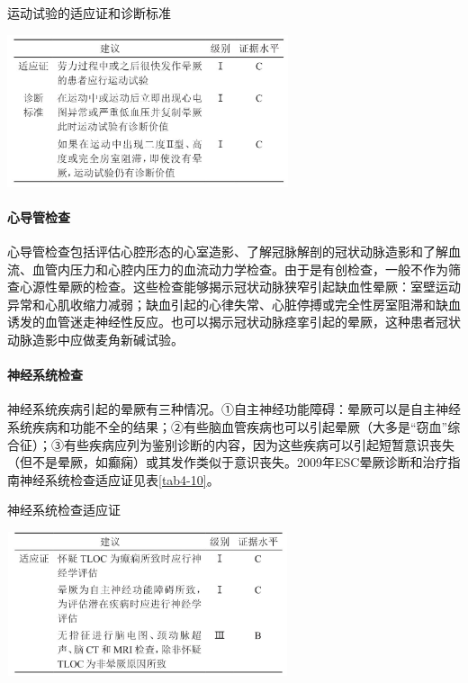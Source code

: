 \begin{table}[htbp]
\centering
\caption{运动试验的适应证和诊断标准}
\label{tab4-9}
\includegraphics[width=3.25in,height=1.76042in]{./images/Image00026.jpg}
\end{table}

\paragraph{心导管检查}

心导管检查包括评估心腔形态的心室造影、了解冠脉解剖的冠状动脉造影和了解血流、血管内压力和心腔内压力的血流动力学检查。由于是有创检查，一般不作为筛查心源性晕厥的检查。这些检查能够揭示冠状动脉狭窄引起缺血性晕厥：室壁运动异常和心肌收缩力减弱；缺血引起的心律失常、心脏停搏或完全性房室阻滞和缺血诱发的血管迷走神经性反应。也可以揭示冠状动脉痉挛引起的晕厥，这种患者冠状动脉造影中应做麦角新碱试验。

\paragraph{神经系统检查}

神经系统疾病引起的晕厥有三种情况。①自主神经功能障碍：晕厥可以是自主神经系统疾病和功能不全的结果；②有些脑血管疾病也可以引起晕厥（大多是“窃血”综合征）；③有些疾病应列为鉴别诊断的内容，因为这些疾病可以引起短暂意识丧失（但不是晕厥，如癫痫）或其发作类似于意识丧失。2009年ESC晕厥诊断和治疗指南神经系统检查适应证见表\ref{tab4-10}。

\begin{table}[htbp]
\centering
\caption{神经系统检查适应证}
\label{tab4-10}
\includegraphics[width=3.25in,height=1.66667in]{./images/Image00027.jpg}
\end{table}

